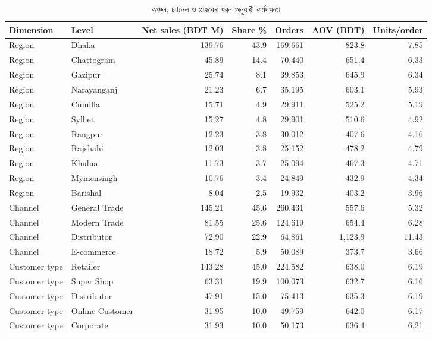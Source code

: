 \begin{table}[htbp]
\centering
\footnotesize
\caption{অঞ্চল, চ্যানেল ও গ্রাহকের ধরন অনুযায়ী কর্মদক্ষতা}
\label{tab:segments}
\begin{adjustbox}{max width=\linewidth}
\begin{tabular}{llrrrrr}
\toprule
\textbf{Dimension} & \textbf{Level} & \textbf{Net sales (BDT M)} & \textbf{Share \%} & \textbf{Orders} & \textbf{AOV (BDT)} & \textbf{Units/order} \\
\midrule
Region & Dhaka & 139.76 & 43.9 & 169,661 & 823.8 & 7.85 \\
Region & Chattogram & 45.89 & 14.4 & 70,440 & 651.4 & 6.33 \\
Region & Gazipur & 25.74 & 8.1 & 39,853 & 645.9 & 6.34 \\
Region & Narayanganj & 21.23 & 6.7 & 35,195 & 603.1 & 5.93 \\
Region & Cumilla & 15.71 & 4.9 & 29,911 & 525.2 & 5.19 \\
Region & Sylhet & 15.27 & 4.8 & 29,901 & 510.6 & 4.92 \\
Region & Rangpur & 12.23 & 3.8 & 30,012 & 407.6 & 4.16 \\
Region & Rajshahi & 12.03 & 3.8 & 25,152 & 478.2 & 4.79 \\
Region & Khulna & 11.73 & 3.7 & 25,094 & 467.3 & 4.71 \\
Region & Mymensingh & 10.76 & 3.4 & 24,849 & 432.9 & 4.34 \\
Region & Barishal & 8.04 & 2.5 & 19,932 & 403.2 & 3.96 \\
Channel & General Trade & 145.21 & 45.6 & 260,431 & 557.6 & 5.32 \\
Channel & Modern Trade & 81.55 & 25.6 & 124,619 & 654.4 & 6.28 \\
Channel & Distributor & 72.90 & 22.9 & 64,861 & 1,123.9 & 11.43 \\
Channel & E-commerce & 18.72 & 5.9 & 50,089 & 373.7 & 3.66 \\
Customer type & Retailer & 143.28 & 45.0 & 224,582 & 638.0 & 6.19 \\
Customer type & Super Shop & 63.31 & 19.9 & 100,073 & 632.7 & 6.16 \\
Customer type & Distributor & 47.91 & 15.0 & 75,413 & 635.3 & 6.19 \\
Customer type & Online Customer & 31.95 & 10.0 & 49,759 & 642.0 & 6.17 \\
Customer type & Corporate & 31.93 & 10.0 & 50,173 & 636.4 & 6.21 \\
\bottomrule
\end{tabular}
\end{adjustbox}
\end{table}